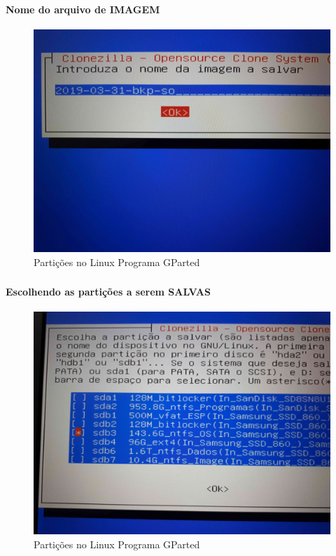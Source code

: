 \documentclass{beamer}
\begin{document}
\begin{frame}[plain,c]
   \frametitle{\insertsection}
    \framesubtitle{Nome do arquivo de IMAGEM}
    \begin{figure}[!h]
        \includegraphics[width=1\linewidth]{images/backup/bkp16.jpg}
        \caption{Partições no Linux Programa GParted}
    \end{figure}
\end{frame}
\begin{frame}[plain,c]
   \frametitle{\insertsection}
    \framesubtitle{Escolhendo as partições a serem SALVAS}
    \begin{figure}[!h]
        \includegraphics[width=1\linewidth]{images/backup/bkp17.jpg}
        \caption{Partições no Linux Programa GParted}
    \end{figure}
\end{frame}
\end{document}
